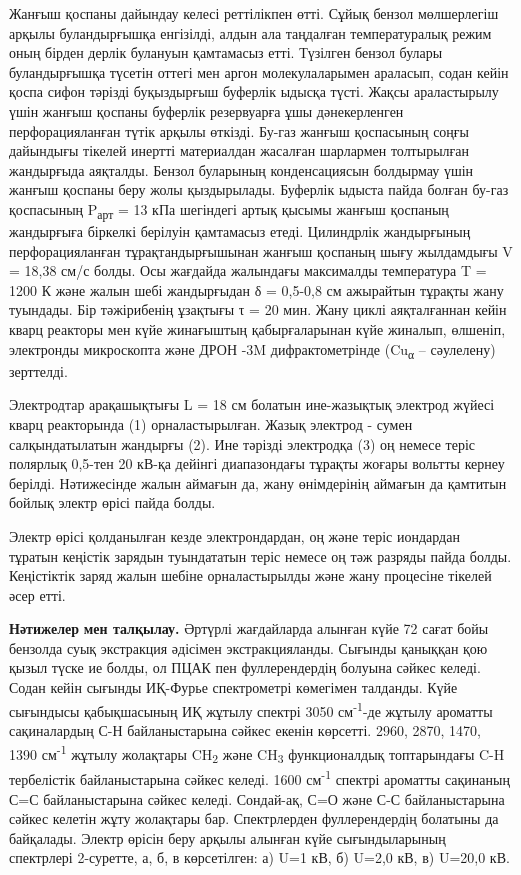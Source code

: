 \begin{multicols}{2}
Жанғыш қоспаны дайындау келесі реттілікпен өтті. Сұйық бензол
мөлшерлегіш арқылы буландырғышқа енгізілді, алдын ала таңдалған
температуралық режим оның бірден дерлік булануын қамтамасыз етті.
Түзілген бензол булары буландырғышқа түсетін оттегі мен аргон
молекулаларымен араласып, содан кейін қоспа сифон тәрізді буқыздырғыш
буферлік ыдысқа түсті. Жақсы араластырылу үшін жанғыш қоспаны буферлік
резервуарға ұшы дәнекерленген перфорацияланған түтік арқылы өткізді.
Бу-газ жанғыш қоспасының соңғы дайындығы тікелей инертті материалдан
жасалған шарлармен толтырылған жандырғыда аяқталды. Бензол буларының
конденсациясын болдырмау үшін жанғыш қоспаны беру жолы қыздырылады.
Буферлік ыдыста пайда болған бу-газ қоспасының P\textsubscript{арт} = 13
кПа шегіндегі артық қысымы жанғыш қоспаның жандырғыға біркелкі берілуін
қамтамасыз етеді. Цилиндрлік жандырғының перфорацияланған
тұрақтандырғышынан жанғыш қоспаның шығу жылдамдығы V = 18,38 см/с болды.
Осы жағдайда жалындағы максималды температура T = 1200 К және жалын шебі
жандырғыдан δ = 0,5-0,8 см ажырайтын тұрақты жану туындады. Бір
тәжірибенің ұзақтығы τ = 20 мин. Жану циклі аяқталғаннан кейін кварц
реакторы мен күйе жинағыштың қабырғаларынан күйе жиналып, өлшеніп,
электронды микроскопта және ДРОН -3M дифрактометрінде
(Cu\textsubscript{α} -- сәулелену) зерттелді.

Электродтар арақашықтығы L = 18 см болатын ине-жазықтық электрод жүйесі
кварц реакторында (1) орналастырылған. Жазық электрод - сумен
салқындатылатын жандырғы (2). Ине тәрізді электродқа (3) оң немесе теріс
полярлық 0,5-тен 20 кВ-қа дейінгі диапазондағы тұрақты жоғары вольтты
кернеу берілді. Нәтижесінде жалын аймағын да, жану өнімдерінің аймағын
да қамтитын бойлық электр өрісі пайда болды.

Электр өрісі қолданылған кезде электрондардан, оң және теріс иондардан
тұратын кеңістік зарядын туындататын теріс немесе оң тәж разряды пайда
болды. Кеңістіктік заряд жалын шебіне орналастырылды және жану процесіне
тікелей әсер етті.

{\bfseries Нәтижелер} {\bfseries мен талқылау.} Әртүрлі жағдайларда алынған
күйе 72 сағат бойы бензолда суық экстракция әдісімен экстракцияланды.
Сығынды қаныққан қою қызыл түске ие болды, ол ПЦАК пен фуллерендердің
болуына сәйкес келеді. Содан кейін сығынды ИҚ-Фурье спектрометрі
көмегімен талданды. Күйе сығындысы қабықшасының ИҚ жұтылу спектрі 3050
см\textsuperscript{-1}-де жұтылу ароматты сақиналардың С-Н
байланыстарына сәйкес екенін көрсетті. 2960, 2870, 1470, 1390
см\textsuperscript{-1} жұтылу жолақтары CH\textsubscript{2} және
CH\textsubscript{3} функционалдық топтарындағы C-H тербелістік
байланыстарына сәйкес келеді. 1600 см\textsuperscript{-1} спектрі
ароматты сақинаның С=С байланыстарына сәйкес келеді. Сондай-ақ, С=О және
С-С байланыстарына сәйкес келетін жұту жолақтары бар. Спектрлерден
фуллерендердің болатыны да байқалады. Электр өрісін беру арқылы алынған
күйе сығындыларының спектрлері 2-суретте, а, б, в көрсетілген: а) U=1
кВ, б) U=2,0 кВ, в) U=20,0 кВ.
\end{multicols}

